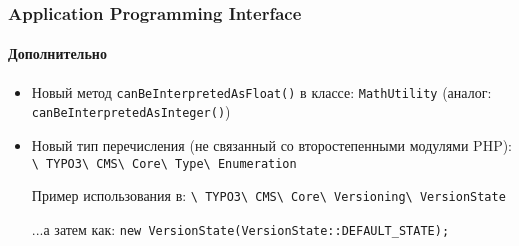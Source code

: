 \begin{frame}[fragile]
	\frametitle{Application Programming Interface}
	\framesubtitle{Дополнительно}

	\begin{itemize}
		\item Новый метод \texttt{canBeInterpretedAsFloat()} в классе: \texttt{MathUtility}\newline
			\small(аналог: \texttt{canBeInterpretedAsInteger()})\normalsize
		\item Новый тип перечисления (не связанный со второстепенными модулями PHP):\newline
			\texttt{\textbackslash
				TYPO3\textbackslash
				CMS\textbackslash
				Core\textbackslash
				Type\textbackslash
				Enumeration}\newline

			Пример использования в:\newline
			\texttt{\textbackslash
				TYPO3\textbackslash
				CMS\textbackslash
				Core\textbackslash
				Versioning\textbackslash
				VersionState}\newline

			...а затем как:\newline
			\texttt{new VersionState(VersionState::DEFAULT\_STATE);}

	\end{itemize}

\end{frame}


